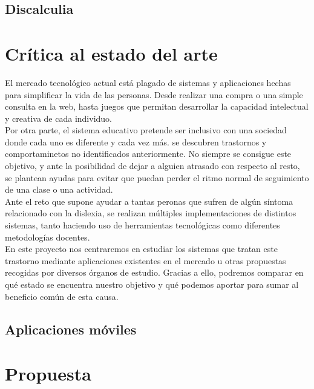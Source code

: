 \subsection{Discalculia}

\section{Crítica al estado del arte}
El mercado tecnológico actual está plagado de sistemas y aplicaciones hechas para simplificar la vida de las personas. Desde realizar una compra o una simple consulta en la web, hasta juegos que permitan desarrollar la capacidad intelectual y creativa de cada individuo.
\\

Por otra parte, el sistema educativo pretende ser inclusivo con una sociedad donde cada uno es diferente y cada vez más. se descubren trastornos y comportaminetos no identificados anteriormente. No siempre se consigue este objetivo, y ante la posibilidad de dejar a alguien atrasado con respecto al resto, se plantean ayudas para evitar que puedan perder el ritmo normal de seguimiento de una clase o una actividad.
\\

Ante el reto que supone ayudar a tantas peronas que sufren de algún síntoma relacionado con la dislexia, se realizan múltiples implementaciones de distintos sistemas, tanto haciendo uso de herramientas tecnológicas como diferentes metodologías docentes. 
\\

En este proyecto nos centraremos en estudiar los sistemas que tratan este trastorno mediante aplicaciones existentes en el mercado u otras propuestas recogidas por diversos órganos de estudio. Gracias a ello, podremos comparar en qué estado se encuentra nuestro objetivo y qué podemos aportar para sumar al beneficio común de esta causa.  

\subsection{Aplicaciones móviles}

\section{Propuesta}
